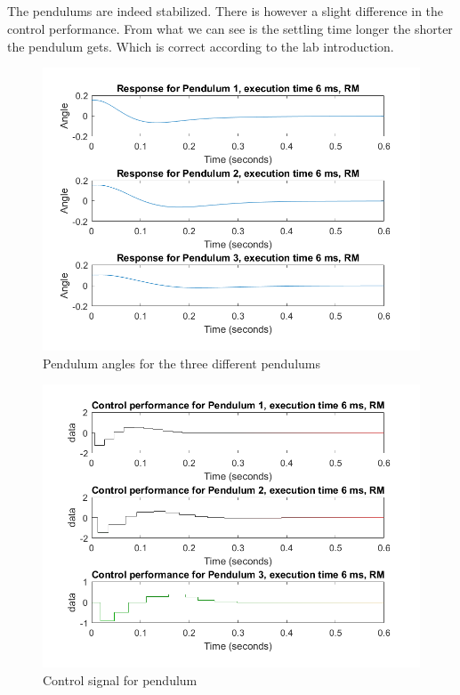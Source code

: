 \documentclass[12pt,a4paper]{article}
\begin{document}
\subsection{}%
 The pendulums are indeed stabilized. There is however a slight
 difference in the control performance. From what we can see is the
 settling time longer the shorter the pendulum gets. Which is correct
 according to the lab    	introduction. 
  \begin{center}
      \begin{figure}[H]
      \centering
        \includegraphics[scale=0.5]{ex31.png}
        \caption{Pendulum angles for the three different pendulums}
        \label{fig:ex31}
      \end{figure}
    \end{center}
    
    \begin{center}
      \begin{figure}[H]
      \centering
        \includegraphics[scale=0.5]{ex32.png}
      \caption{Control signal for pendulum}
        \label{fig:ex32}
      \end{figure}
    \end{center}
\end{document}
